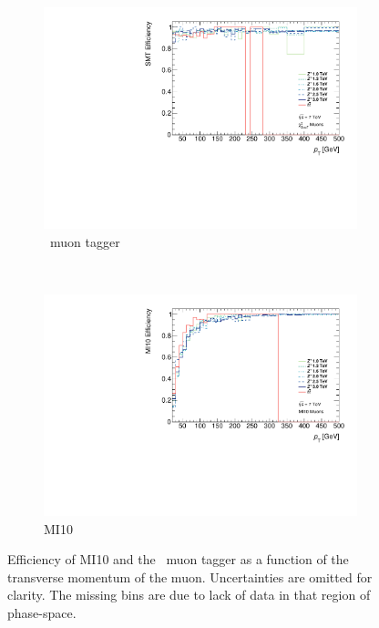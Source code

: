 \begin{figure}[htbp]
  \begin{subfigure}{0.49\linewidth}
    \centering
    \includegraphics[width=\textwidth]{PartBoosted/Plots/he_staco_smt_pt.pdf}
    \caption{\xsm\ muon tagger}\label{fig:BoostedSMTeffVsPt}
  \end{subfigure}
~%
  \begin{subfigure}{0.49\linewidth}
    \centering
    \includegraphics[width=\textwidth]{PartBoosted/Plots/he_muid_mi10_pt.pdf}
    \caption{MI10}\label{fig:BoostedMIeffVsPt}
  \end{subfigure}

  \caption{Efficiency of MI10 and the \xsm\ muon tagger as a function of the transverse momentum of the muon. Uncertainties are omitted for clarity. The missing bins are due to lack of data in that region of phase-space.}\label{fig:BoostedEfficiencyVsPt}
\end{figure}

